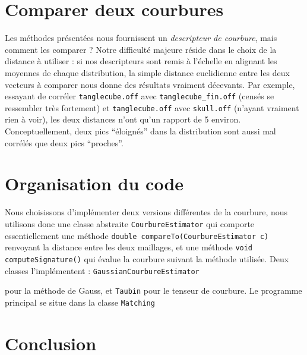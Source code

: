 \documentclass{llncs}
\begin{document}
\section{Comparer deux courbures}
Les méthodes présentées nous fournissent un \textit{descripteur de courbure}, mais comment les comparer ? Notre difficulté majeure réside dans le choix de la distance à utiliser : si nos descripteurs sont remis à l'échelle en alignant les moyennes de chaque distribution, la simple distance euclidienne entre les deux vecteurs à comparer nous donne des résultats vraiment décevants. Par exemple, essayant de corréler \texttt{tanglecube.off} avec \texttt{tanglecube\_fin.off} (censés se ressembler très fortement) et \texttt{tanglecube.off} avec \texttt{skull.off} (n'ayant vraiment rien à voir), les deux distances n'ont qu'un rapport de 5 environ. Conceptuellement, deux pics ``éloignés'' dans la distribution sont aussi mal corrélés que deux pics ``proches''.

\section{Organisation du code}

Nous choisissons d'implémenter deux versions différentes de la courbure, nous utilisons donc une classe abstraite \texttt{CourbureEstimator} qui comporte essentiellement une méthode \texttt{double compareTo(CourbureEstimator c)} renvoyant la distance entre les deux maillages, et une méthode \texttt{void computeSignature()} qui évalue la courbure suivant la méthode utilisée. Deux classes l'implémentent : \texttt{GaussianCourbureEstimator}

pour la méthode de Gauss, et \texttt{Taubin} pour le tenseur de courbure. Le programme principal se situe dans la classe \texttt{Matching}


\section{Conclusion}




\end{document}
